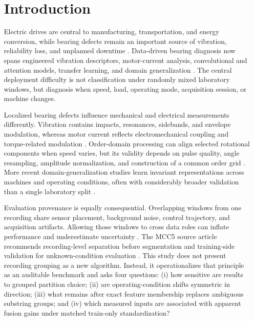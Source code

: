 \documentclass[machines,article,submit,oneauthor]{Definitions/mdpi}
\begin{document}
\section{Introduction}
Electric drives are central to manufacturing, transportation, and energy conversion, while bearing defects remain an important source of vibration, reliability loss, and unplanned downtime \cite{Lei2020Roadmap,Zio2021PHM,Fernandes2022IndustrialReview,Zonta2024AIPdM}. Data-driven bearing diagnosis now spans engineered vibration descriptors, motor-current analysis, convolutional and attention models, transfer learning, and domain generalization \cite{Zhang2020DLBearingReview,Neupane2020CWRUReview,Tama2022DLVibrationReview,Chen2023DeepTransferReview,Xiao2024DGSurvey}. The central deployment difficulty is not classification under randomly mixed laboratory windows, but diagnosis when speed, load, operating mode, acquisition session, or machine changes.

Localized bearing defects influence mechanical and electrical measurements differently. Vibration contains impacts, resonances, sidebands, and envelope modulation, whereas motor current reflects electromechanical coupling and torque-related modulation \cite{Gundewar2020InductionMotorReview,Toma2020MotorCurrentGA,Hoang2019MotorCurrentFusion,Guan2023MotorCurrentCausalConv}. Order-domain processing can align selected rotational components when speed varies, but its validity depends on pulse quality, angle resampling, amplitude normalization, and construction of a common order grid \cite{Lu2019TacholessReview,Jiang2023TacholessOrder,Duan2021AdaptiveTacholess,Ji2021OrderTracking1DCNN}. More recent domain-generalization studies learn invariant representations across machines and operating conditions, often with considerably broader validation than a single laboratory split \cite{Zhu2024DIRNet,Huang2025DPJDG}.

Evaluation provenance is equally consequential. Overlapping windows from one recording share sensor placement, background noise, control trajectory, and acquisition artifacts. Allowing those windows to cross data roles can inflate performance and underestimate uncertainty \cite{Kapoor2023Leakage,Hendriks2021CWRUBenchmark,Ragab2023AdaTime,Vieira2024ConnectomeLeakage,Wen2021MRILLeakage}. The MCC5 source article recommends recording-level separation before segmentation and training-side validation for unknown-condition evaluation \cite{Chen2026MCC5DataBrief,Chen2025MCC5Mendeley}. This study does not present recording grouping as a new algorithm. Instead, it operationalizes that principle as an auditable benchmark and asks four questions: (i) how sensitive are results to grouped partition choice; (ii) are operating-condition shifts symmetric in direction; (iii) what remains after exact feature membership replaces ambiguous substring groups; and (iv) which measured inputs are associated with apparent fusion gains under matched train-only standardization?
\end{document}

